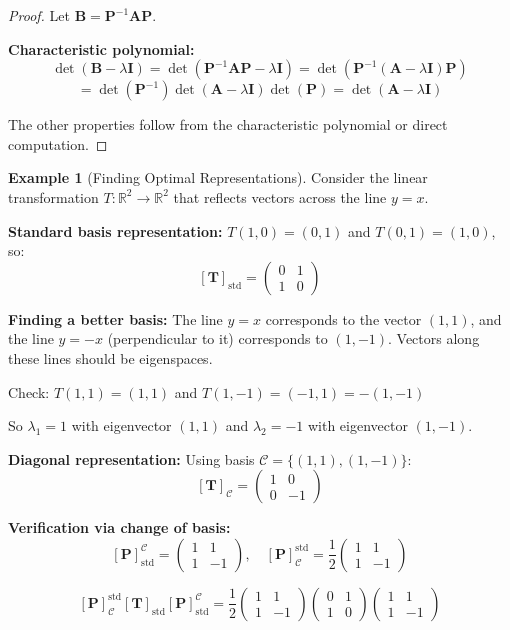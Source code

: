 \documentclass[12pt]{article}
\numberwithin{equation}{section}
\newcommand{\mat}[1]{\mathbf{#1}}        %
\theoremstyle{plain}
\theoremstyle{definition}
\newtheorem{example}[theorem]{Example}
\theoremstyle{remark}
\begin{document}
\begin{proof}
Let $\mat{B} = \mat{P}^{-1}\mat{A}\mat{P}$.

\textbf{Characteristic polynomial:}
$$\det(\mat{B} - \lambda\mat{I}) = \det(\mat{P}^{-1}\mat{A}\mat{P} - \lambda\mat{I}) = \det(\mat{P}^{-1}(\mat{A} - \lambda\mat{I})\mat{P})$$
$$= \det(\mat{P}^{-1})\det(\mat{A} - \lambda\mat{I})\det(\mat{P}) = \det(\mat{A} - \lambda\mat{I})$$

The other properties follow from the characteristic polynomial or direct computation.
\end{proof}

\begin{example}[Finding Optimal Representations]
Consider the linear transformation $T: \mathbb{R}^2 \to \mathbb{R}^2$ that reflects vectors across the line $y = x$.

\textbf{Standard basis representation:}
$T(1,0) = (0,1)$ and $T(0,1) = (1,0)$, so:
$$[\mat{T}]_{\text{std}} = \begin{pmatrix} 0 & 1 \\ 1 & 0 \end{pmatrix}$$

\textbf{Finding a better basis:}
The line $y = x$ corresponds to the vector $(1,1)$, and the line $y = -x$ (perpendicular to it) corresponds to $(1,-1)$. Vectors along these lines should be eigenspaces.

Check: $T(1,1) = (1,1)$ and $T(1,-1) = (-1,1) = -(1,-1)$

So $\lambda_1 = 1$ with eigenvector $(1,1)$ and $\lambda_2 = -1$ with eigenvector $(1,-1)$.

\textbf{Diagonal representation:}
Using basis $\mathcal{C} = \{(1,1), (1,-1)\}$:
$$[\mat{T}]_{\mathcal{C}} = \begin{pmatrix} 1 & 0 \\ 0 & -1 \end{pmatrix}$$

\textbf{Verification via change of basis:}
$$[\mat{P}]_{\text{std}}^{\mathcal{C}} = \begin{pmatrix} 1 & 1 \\ 1 & -1 \end{pmatrix}, \quad [\mat{P}]_{\mathcal{C}}^{\text{std}} = \frac{1}{2}\begin{pmatrix} 1 & 1 \\ 1 & -1 \end{pmatrix}$$

$$[\mat{P}]_{\mathcal{C}}^{\text{std}} [\mat{T}]_{\text{std}} [\mat{P}]_{\text{std}}^{\mathcal{C}} = \frac{1}{2}\begin{pmatrix} 1 & 1 \\ 1 & -1 \end{pmatrix}\begin{pmatrix} 0 & 1 \\ 1 & 0 \end{pmatrix}\begin{pmatrix} 1 & 1 \\ 1 & -1 \end{pmatrix}$$


\end{example}
\end{document}
